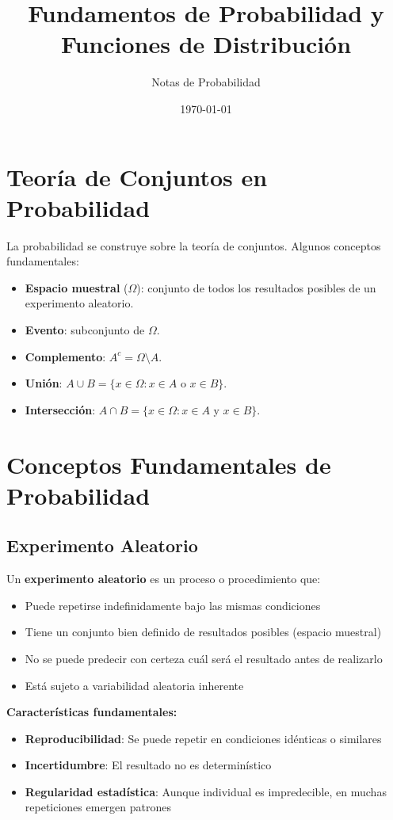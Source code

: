 \documentclass[12pt,a4paper]{article}
\title{Fundamentos de Probabilidad y Funciones de Distribución}
\author{Notas de Probabilidad}
\date{\today}
\begin{document}
\maketitle

\section{Teoría de Conjuntos en Probabilidad}
La probabilidad se construye sobre la teoría de conjuntos. Algunos conceptos fundamentales:
\begin{itemize}
    \item \textbf{Espacio muestral} ($\Omega$): conjunto de todos los resultados posibles de un experimento aleatorio.
    \item \textbf{Evento}: subconjunto de $\Omega$.
    \item \textbf{Complemento}: $A^c = \Omega \setminus A$.
    \item \textbf{Unión}: $A \cup B = \{x \in \Omega : x \in A \text{ o } x \in B\}$.
    \item \textbf{Intersección}: $A \cap B = \{x \in \Omega : x \in A \text{ y } x \in B\}$.
\end{itemize}

\section{Conceptos Fundamentales de Probabilidad}

\subsection{Experimento Aleatorio}

Un \textbf{experimento aleatorio} es un proceso o procedimiento que:
\begin{itemize}
    \item Puede repetirse indefinidamente bajo las mismas condiciones
    \item Tiene un conjunto bien definido de resultados posibles (espacio muestral)
    \item No se puede predecir con certeza cuál será el resultado antes de realizarlo
    \item Está sujeto a variabilidad aleatoria inherente
\end{itemize}

\textbf{Características fundamentales:}
\begin{itemize}
    \item \textbf{Reproducibilidad}: Se puede repetir en condiciones idénticas o similares
    \item \textbf{Incertidumbre}: El resultado no es determinístico
    \item \textbf{Regularidad estadística}: Aunque individual es impredecible, en muchas repeticiones emergen patrones
\end{itemize}
\end{document}
